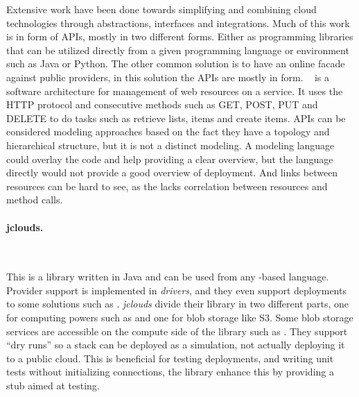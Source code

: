 Extensive work have been done towards simplifying and combining cloud technologies through
abstractions, interfaces and integrations.
Much of this work is in form of APIs, mostly in two different forms.
Either as programming libraries that can be utilized directly from a given 
programming language or environment such as Java or Python.
The other common solution is to have an online facade against public providers,
in this solution the APIs are mostly in  form.
~\cite{rest:fielding00} is a software architecture for management of web resources
on a service. It uses the HTTP protocol and consecutive methods such as GET, POST, PUT and DELETE
to do tasks such as retrieve lists, items and create items.
APIs can be considered modeling approaches based on the fact they have a topology 
and hierarchical structure, 
but it is not a distinct modeling. 
A modeling language could overlay the code and help providing a clear overview, 
but the language directly would not provide a good overview of deployment. 
And links between resources can be hard to see, 
as the  lacks correlation between resources and method calls. 




\paragraph{jclouds.}~\cite{jclouds}

This is a library written in Java and can be used from any -based language.
Provider support is implemented in \emph{drivers}, and they even support deployments
to some  solutions such as .
\emph{jclouds} divide their library in two different parts, one for computing powers 
such as  and one for blob storage like S3. 
Some blob storage services are accessible on the compute side of the library such
as .
They support ``dry runs'' so a stack can be deployed as a simulation, not 
actually deploying it to a public cloud.
This is beneficial for testing deployments, and writing unit tests without initializing
connections, the library enhance this by providing a stub aimed at testing.

